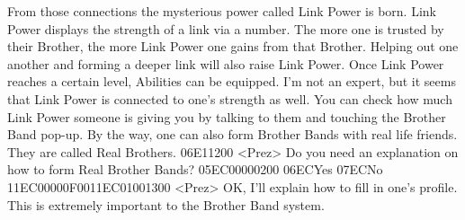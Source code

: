 From those connections the mysterious power called Link Power is born. 
Link Power displays the strength of a link via a number. 
The more one is trusted by their Brother, the more 
Link Power one gains from that Brother. 
Helping out one another and forming a deeper link will also raise Link Power. 
Once Link Power reaches a certain level, Abilities can be equipped. 
I'm not an expert, but it seems that Link Power is 
connected to one's strength as well. 
You can check how much Link Power someone is giving you by talking to 
them and touching the Brother Band pop-up. 
By the way, one can also form Brother Bands with 
real life friends. They are called Real Brothers. 
{06}{E1}{12}{00}
<Prez> Do you need an  explanation on how to form Real Brother Bands? 
{05}{EC}{00}{00}{02}{00}   {06}{EC}Yes   {07}{EC}No 
{11}{EC}{00}{00}{0F}{00}{11}{EC}{01}{00}{13}{00}
<Prez> OK, I'll explain how to fill in one's profile. This is 
extremely important to the Brother Band system. 
